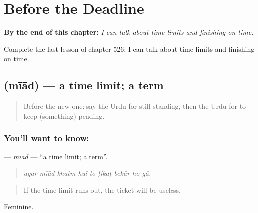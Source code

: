 
\chapter{Before the Deadline}
\label{ch:ur-before-the-deadline}

\begin{chapteropening}
\textbf{By the end of this chapter:} \emph{I can talk about time limits and finishing on time.}

Complete the last lesson of chapter 526: I can talk about time limits and finishing on time.
\end{chapteropening}

\section[\texorpdfstring{\ur{میعاد} (mīād)}{میعاد (mīād)}]{ (mīād) — a time limit; a term}

\label{lesson:UR-C526-miad}



\begin{quote}
Before the new one: say the Urdu for still standing, then the Urdu for to keep (something) pending.
\end{quote}

\subsection*{You'll want to know: }
\textbf{} — \emph{mīād} — \textquotedblleft{}a time limit; a term\textquotedblright{}.

\begin{quote}
        
\end{quote}

\begin{quote}
\emph{agar mīād khatm huī to ṭikaṭ bekār ho gā.}
\end{quote}

\begin{quote}
If the time limit runs out, the ticket will be useless.
\end{quote}

Feminine.

